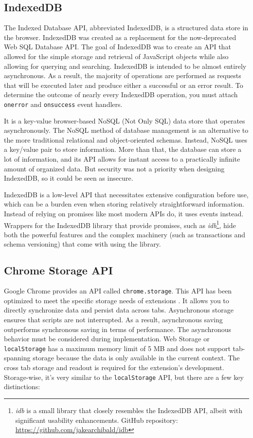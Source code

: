 \subsection*{IndexedDB}
The Indexed Database API, abbreviated IndexedDB, is a structured data store in the browser. IndexedDB was created as a replacement for the now-deprecated Web SQL Database API. The goal of IndexedDB was to create an API that allowed for the simple storage and retrieval of JavaScript objects while also allowing for querying and searching. IndexedDB is intended to be almost entirely asynchronous. As a result, the majority of operations are performed as requests that will be executed later and produce either a successful or an error result. To determine the outcome of nearly every IndexedDB operation, you must attach \texttt{onerror} and \texttt{onsuccess} event handlers.

It is a key-value browser-based NoSQL (Not Only SQL) data store that operates asynchronously. The NoSQL method of database management is an alternative to the more traditional relational and object-oriented schemas. Instead, NoSQL uses a key/value pair to store information. More than that, the database can store a lot of information, and its API allows for instant access to a practically infinite amount of organized data. But security was not a priority when designing IndexedDB, so it could be seen as insecure.

IndexedDB is a low-level API that necessitates extensive configuration before use, which can be a burden even when storing relatively straightforward information. Instead of relying on promises like most modern APIs do, it uses events instead. Wrappers for the IndexedDB library that provide promises, such as \emph{idb}\footnote{\emph{idb} is a small library that closely resembles the IndexedDB API, albeit with significant usability enhancements. GitHub repository: \url{https://github.com/jakearchibald/idb}}, hide both the powerful features and the complex machinery (such as transactions and schema versioning) that come with using the library.

\subsection*{Chrome Storage API}
Google Chrome provides an API called \texttt{chrome.storage}. This API has been optimized to meet the specific storage needs of extensions \autocite{chrome2021storage}. It allows you to directly synchronize data and persist data across tabs. Asynchronous storage ensures that scripts are not interrupted. As a result, asynchronous saving outperforms synchronous saving in terms of performance. The asynchronous behavior must be considered during implementation. Web Storage or \texttt{localStorage} has a maximum memory limit of 5 MB and does not support tab-spanning storage because the data is only available in the current context. The cross tab storage and readout is required for the extension's development. Storage-wise, it's very similar to the \texttt{localStorage} API, but there are a few key distinctions:

